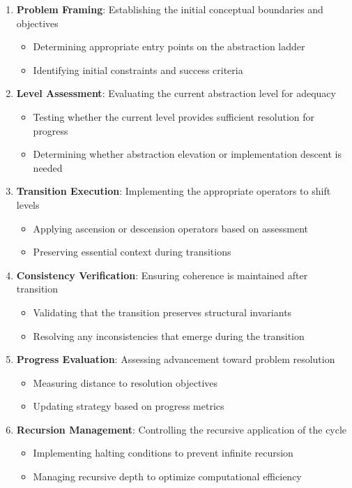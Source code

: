 \documentclass[
]{article}
\providecommand{\tightlist}{%
  \setlength{\itemsep}{0pt}\setlength{\parskip}{0pt}}
\begin{document}
\begin{enumerate}
\def\labelenumi{\arabic{enumi}.}
\tightlist
\item
  \textbf{Problem Framing}: Establishing the initial conceptual
  boundaries and objectives

  \begin{itemize}
  \tightlist
  \item
    Determining appropriate entry points on the abstraction ladder
  \item
    Identifying initial constraints and success criteria
  \end{itemize}
\item
  \textbf{Level Assessment}: Evaluating the current abstraction level
  for adequacy

  \begin{itemize}
  \tightlist
  \item
    Testing whether the current level provides sufficient resolution for
    progress
  \item
    Determining whether abstraction elevation or implementation descent
    is needed
  \end{itemize}
\item
  \textbf{Transition Execution}: Implementing the appropriate operators
  to shift levels

  \begin{itemize}
  \tightlist
  \item
    Applying ascension or descension operators based on assessment
  \item
    Preserving essential context during transitions
  \end{itemize}
\item
  \textbf{Consistency Verification}: Ensuring coherence is maintained
  after transition

  \begin{itemize}
  \tightlist
  \item
    Validating that the transition preserves structural invariants
  \item
    Resolving any inconsistencies that emerge during the transition
  \end{itemize}
\item
  \textbf{Progress Evaluation}: Assessing advancement toward problem
  resolution

  \begin{itemize}
  \tightlist
  \item
    Measuring distance to resolution objectives
  \item
    Updating strategy based on progress metrics
  \end{itemize}
\item
  \textbf{Recursion Management}: Controlling the recursive application
  of the cycle

  \begin{itemize}
  \tightlist
  \item
    Implementing halting conditions to prevent infinite recursion
  \item
    Managing recursive depth to optimize computational efficiency
  \end{itemize}
\end{enumerate}
\end{document}
